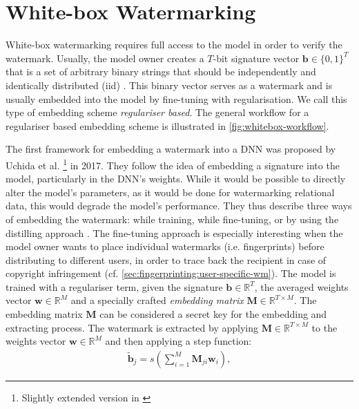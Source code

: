 \section{White-box Watermarking}
\label{sec:whitebox}
White-box watermarking requires full access to the model in order to verify the watermark. Usually, the model owner creates a $T$-bit signature vector $\mathbf{b} \in \{0,1\}^T$ that is a set of arbitrary binary strings that should be independently and identically distributed (iid) \cite{rouhani_deepsigns_2019}. This binary vector serves as a watermark and is usually embedded into the model by fine-tuning with regularisation. We call this type of embedding scheme \textit{regulariser based}. The general workflow for a regulariser based embedding scheme is illustrated in \cref{fig:whitebox-workflow}.

The first framework for embedding a watermark into a DNN was proposed by Uchida et al. \cite{uchida_embedding_2017}\footnote{Slightly extended version in \cite{nagai_digital_2018}} in 2017. They follow the idea of embedding a signature into the model, particularly in the DNN's weights. 
While it would be possible to directly alter the model's parameters, as it would be done for watermarking relational data, this would degrade the model's performance.
They thus describe three ways of embedding the watermark: while training, while fine-tuning, or by using the distilling approach \cite{hinton_distilling_2015}. The fine-tuning approach is especially interesting when the model owner wants to place individual watermarks (i.e. fingerprints) before distributing to different users, in order to trace back the recipient in case of copyright infringement (cf. \cref{sec:fingerprinting:user-specific-wm}). The model is trained with a regulariser term, given the signature $\mathbf{b} \in \mathbb{R}^T$, the averaged weights vector $\mathbf{w} \in \mathbb{R}^M$ and a specially crafted \textit{embedding matrix} $\mathbf{M} \in \mathbb{R}^{T \times M}$. The embedding matrix $\mathbf{M}$ can be considered a secret key for the embedding and extracting process. The watermark is extracted by applying $\mathbf{M} \in \mathbb{R}^{T \times M}$ to the weights vector $\mathbf{w} \in \mathbb{R}^M$ and then applying a step function:
\begin{align}
    \mathbf{\tilde b}_j = s(\sum_{i=1}^M \mathbf{M}_{ji}\mathbf{w}_i),
\end{align}
